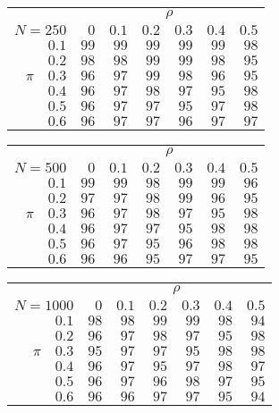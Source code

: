\begin{tabular}{r|rrrrrr}
\hline\hline
 &\multicolumn{6}{c}{$\rho$} \\ 
 $N = 250$ & $0$ & $0.1$ & $0.2$ & $0.3$ & $0.4$ & $0.5$ \\ 
 \hline$0.1$ & $99$ & $99$ & $99$ & $99$ & $99$ & $98$\\ 
$0.2$ & $98$ & $98$ & $99$ & $99$ & $98$ & $95$\\ 
$\pi\quad$$0.3$ & $96$ & $97$ & $99$ & $98$ & $96$ & $95$\\ 
$0.4$ & $96$ & $97$ & $98$ & $97$ & $95$ & $98$\\ 
$0.5$ & $96$ & $97$ & $97$ & $95$ & $97$ & $98$\\ 
$0.6$ & $96$ & $97$ & $97$ & $96$ & $97$ & $97$\\ 
 \hline 
 \end{tabular}
 
 \vspace{2em} 
 
\begin{tabular}{r|rrrrrr}
\hline\hline
 &\multicolumn{6}{c}{$\rho$} \\ 
 $N = 500$ & $0$ & $0.1$ & $0.2$ & $0.3$ & $0.4$ & $0.5$ \\ 
 \hline$0.1$ & $99$ & $99$ & $98$ & $99$ & $99$ & $96$\\ 
$0.2$ & $97$ & $97$ & $98$ & $99$ & $96$ & $95$\\ 
$\pi\quad$$0.3$ & $96$ & $97$ & $98$ & $97$ & $95$ & $98$\\ 
$0.4$ & $96$ & $97$ & $97$ & $95$ & $98$ & $98$\\ 
$0.5$ & $96$ & $97$ & $95$ & $96$ & $98$ & $98$\\ 
$0.6$ & $96$ & $96$ & $95$ & $97$ & $97$ & $95$\\ 
 \hline 
 \end{tabular}
 
 \vspace{2em} 
 
\begin{tabular}{r|rrrrrr}
\hline\hline
 &\multicolumn{6}{c}{$\rho$} \\ 
 $N = 1000$ & $0$ & $0.1$ & $0.2$ & $0.3$ & $0.4$ & $0.5$ \\ 
 \hline$0.1$ & $98$ & $98$ & $99$ & $99$ & $98$ & $94$\\ 
$0.2$ & $96$ & $97$ & $98$ & $97$ & $95$ & $98$\\ 
$\pi\quad$$0.3$ & $95$ & $97$ & $97$ & $95$ & $98$ & $98$\\ 
$0.4$ & $96$ & $97$ & $95$ & $97$ & $98$ & $97$\\ 
$0.5$ & $96$ & $97$ & $96$ & $98$ & $97$ & $95$\\ 
$0.6$ & $96$ & $96$ & $97$ & $97$ & $95$ & $94$\\ 
 \hline 
 \end{tabular}
